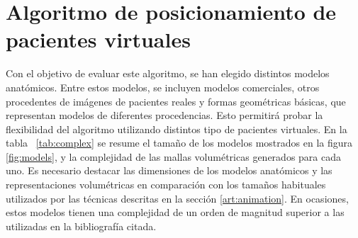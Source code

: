 \clearpage
\section{Algoritmo de posicionamiento de pacientes virtuales} 
\label{posing:result}


Con el objetivo de evaluar este algoritmo, se han elegido distintos modelos anatómicos.
Entre estos modelos, se incluyen modelos comerciales, otros procedentes de imágenes de pacientes reales 
y formas geométricas básicas, que representan modelos de diferentes procedencias. Esto permitirá probar la flexibilidad del algoritmo utilizando distintos tipo de pacientes virtuales.
En la tabla ~\ref{tab:complex} se resume el tamaño de los modelos mostrados en la figura \ref{fig:models}, y la complejidad de las mallas volumétricas generados para cada uno. Es necesario destacar las dimensiones de los modelos anatómicos y las representaciones volumétricas en comparación con los tamaños habituales 
utilizados por las técnicas descritas en la sección \ref{art:animation}. 
En ocasiones, estos modelos tienen una complejidad de un orden de magnitud superior a las utilizadas en la bibliografía citada.

